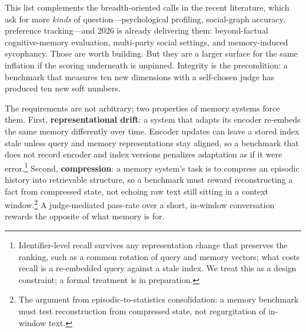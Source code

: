 \documentclass[11pt]{article}
\begin{document}
This list complements the breadth-oriented calls in the recent literature, which ask for more \emph{kinds} of question---psychological profiling, social-graph accuracy, preference tracking\citep[\S5.4]{synthius}---and 2026 is already delivering them: beyond-factual cognitive-memory evaluation\citep{locomoplus}, multi-party social settings\citep{socialmembench}, and memory-induced sycophancy\citep{memsyco}. Those are worth building. But they are a larger surface for the same inflation if the scoring underneath is unpinned. Integrity is the precondition: a benchmark that measures ten new dimensions with a self-chosen judge has produced ten new soft numbers.

The requirements are not arbitrary; two properties of memory systems force them. First, \textbf{representational drift}: a system that adapts its encoder re-embeds the same memory differently over time. Encoder updates can leave a stored index stale unless query and memory representations stay aligned, so a benchmark that does not record encoder and index versions penalizes adaptation as if it were error.\footnote{Identifier-level recall survives any representation change that preserves the ranking, such as a common rotation of query and memory vectors; what costs recall is a re-embedded query against a stale index. We treat this as a design constraint; a formal treatment is in preparation.} Second, \textbf{compression}: a memory system's task is to compress an episodic history into retrievable structure, so a benchmark must reward reconstructing a fact from compressed state, not echoing raw text still sitting in a context window.\footnote{The argument from episodic-to-statistics consolidation: a memory benchmark must test reconstruction from compressed state, not regurgitation of in-window text.} A judge-mediated pass-rate over a short, in-window conversation rewards the opposite of what memory is for.
\end{document}
